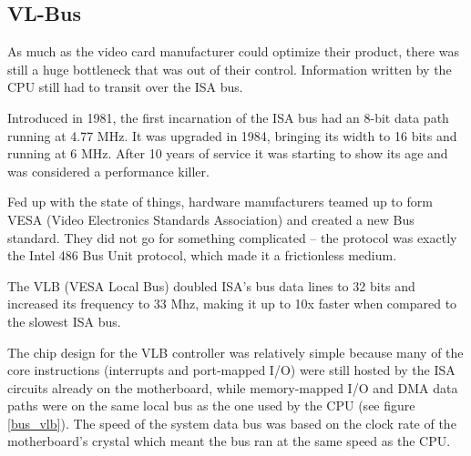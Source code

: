 \subsection{VL-Bus}
As much as the video card manufacturer could optimize their product, there was still a huge bottleneck that was out of their control. Information written by the CPU still had to transit over the ISA bus.\\
\par
 Introduced in 1981, the first incarnation of the ISA bus had an 8-bit data path running at 4.77 MHz. It was upgraded in 1984, bringing its width to 16 bits and running at 6 MHz. After 10 years of service it was starting to show its age and was considered a performance killer.\\
\par
{}
\par
Fed up with the state of things, hardware manufacturers teamed up to form VESA (Video Electronics Standards Association) and created a new Bus standard. They did not go for something complicated -- the protocol was exactly the Intel 486 Bus Unit protocol, which made it a frictionless medium.\\
\par 
The VLB (VESA Local Bus) doubled ISA's bus data lines to 32 bits and increased its frequency to 33 Mhz, making it up to 10x faster when compared to the slowest ISA bus.\\
\par
The chip design for the VLB controller was relatively simple because many of the core instructions (interrupts and port-mapped I/O) were still hosted by the ISA circuits already on the motherboard, while memory-mapped I/O and DMA data paths were on the same local bus as the one used by the CPU (see figure \ref{bus_vlb}). The speed of the system data bus was based on the clock rate of the motherboard's crystal which meant the bus ran at the same speed as the CPU.\\
\par
{}
\label{vlbarchitecture}

